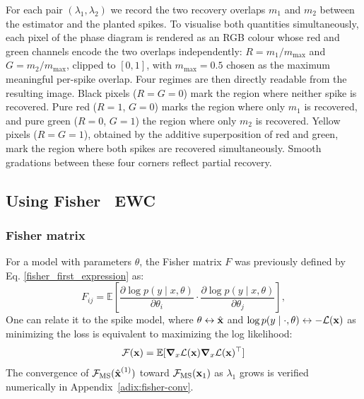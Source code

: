 \documentclass[11pt]{article}
\begin{document}
For each pair $(\lambda_1, \lambda_2)$ we record the two recovery overlaps $m_1$ and $m_2$ between the estimator and the planted spikes. To visualise both quantities simultaneously, each pixel of the phase diagram is rendered as an RGB colour whose red and green channels encode the two overlaps independently: $R = m_1 / m_{\max}$ and $G = m_2 / m_{\max}$, clipped to $[0,1]$, with $m_{\max} = 0.5$ chosen as the maximum meaningful per-spike overlap. Four regimes are then directly readable from the resulting image. Black pixels ($R = G = 0$) mark the region where neither spike is recovered. Pure red ($R = 1$, $G = 0$) marks the region where only $m_1$ is recovered, and pure green ($R = 0$, $G = 1$) the region where only $m_2$ is recovered. Yellow pixels ($R = G = 1$), obtained by the additive superposition of red and green, mark the region where both spikes are recovered simultaneously. Smooth gradations between these four corners reflect partial recovery.








\subsection{Using Fisher ~EWC}
\subsubsection{Fisher matrix}
For a model with parameters $\theta$, the Fisher matrix $F$ was previously defined by Eq. \ref{fisher_first_expression} as:
\begin{equation}
    F_{ij} = \mathbb{E}\left[ \frac{\partial \log p(y \mid x, \theta)}{\partial 
    \theta_i} \cdot \frac{\partial \log p(y \mid x, \theta)}{\partial \theta_j} 
    \right],
\end{equation}
One can relate it to the spike model, where $\theta \leftrightarrow \hat{\boldsymbol{\mathbf{x}}}$ and $\log p(y \mid \cdot, \theta) \leftrightarrow -\mathcal{L}(\boldsymbol{\mathbf{x}})$ as minimizing the loss is equivalent to maximizing the log likelihood:
\begin{equation}
    \mathcal{F}(\boldsymbol{\mathbf{x}})=\mathbb{E} [\boldsymbol{\mathbf{\nabla}}_x\mathcal{L}(\boldsymbol{\mathbf{x}})\boldsymbol{\mathbf{\nabla}}_x \mathcal{L}(\boldsymbol{\mathbf{x}})^\top]
\end{equation}
The convergence of $\mathcal{F}_{\mathrm{MS}}(\hat{\boldsymbol{\mathbf{x}}}^{(1)})$ toward $\mathcal{F}_{\mathrm{MS}}(\boldsymbol{\mathbf{x}}_1)$ as $\lambda_1$ grows is verified numerically in Appendix~\ref{adix:fisher-conv}.
\end{document}
